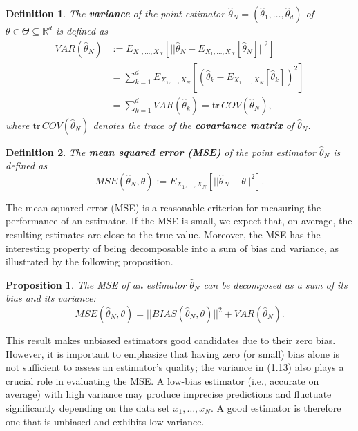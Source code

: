 \documentclass{report}
\newtheorem{definition}{Definition}[chapter]
\newtheorem{proposition}{Proposition}[chapter]
\begin{document}
\begin{definition}
The \textbf{variance} of the point estimator $\hat{\theta}_N = (\hat{\theta}_{1},\dots,\hat{\theta}_{d})$ of $\theta \in \Theta \subseteq \mathbb{R}^d$ is defined as
\begin{equation}
\begin{split}
VAR(\hat{\theta}_N) & := E_{X_1,\dots,X_N}[||\hat{\theta}_N-E_{X_1,\dots,X_N}[\hat{\theta}_N]||^2] \\
& = \sum_{k=1}^{d}E_{X_1,\dots,X_N}[(\hat{\theta}_{k}-E_{X_1,\dots,X_N}[\hat{\theta}_{k}])^2] \\
& = \sum_{k=1}^{d}VAR(\hat{\theta}_{k}) = \mathrm{tr}\,COV(\hat{\theta}_N),
\end{split}
\end{equation}
where $\mathrm{tr}\,COV(\hat{\theta}_N)$ denotes the trace of the \textbf{covariance matrix} of $\hat{\theta}_N$.
\end{definition}

\begin{definition}
The \textbf{mean squared error (MSE)} of the point estimator $\hat{\theta}_N$ is defined as
\begin{equation}
MSE(\hat{\theta}_N,\theta) := E_{X_1,\dots,X_N}[||\hat{\theta}_N - \theta||^2].
\end{equation}
\end{definition}

The mean squared error (MSE) is a reasonable criterion for measuring the performance of an estimator. If the MSE is small, we expect that, on average, the resulting estimates are close to the true value. Moreover, the MSE has the interesting property of being decomposable into a sum of bias and variance, as illustrated by the following proposition.

\begin{proposition}
The MSE of an estimator $\hat{\theta}_N$ can be decomposed as a sum of its bias and its variance:
\begin{equation}
MSE(\hat{\theta}_N,\theta) = ||BIAS(\hat{\theta}_N,\theta)||^2 + VAR(\hat{\theta}_N).
\end{equation}
\end{proposition}

This result makes unbiased estimators good candidates due to their zero bias. However, it is important to emphasize that having zero (or small) bias alone is not sufficient to assess an estimator’s quality; the variance in (1.13) also plays a crucial role in evaluating the MSE. A low-bias estimator (i.e., accurate on average) with high variance may produce imprecise predictions and fluctuate significantly depending on the data set $x_1,\dots,x_N$. A good estimator is therefore one that is unbiased and exhibits low variance. 
\end{document}
